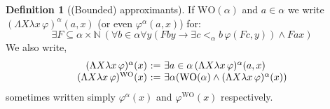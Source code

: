 \documentclass[10pt,a4paper]{amsart}
\theoremstyle{plain}
\theoremstyle{definition}
\newtheorem{definition}[definition]{Definition}
\renewcommand{\phi}{\varphi}
\theoremstyle{plain}
\theoremstyle{definition} %
\newcommand{\Nat}{\mathbb{N}}
\renewcommand{\land}{\wedge}
\newcommand{\limp}{\to}
\newcommand{\Sin}[2]{\Sigma^{#1}_{#2}}
\newcommand{\WO}{\mathrm{WO}}
\newcommand{\oper}[3]{\Lambda #1 \lambda #2 \, #3}
\newcommand{\apprx}[4]{(\oper #1 #2 #3)^{#4}}
\begin{document}
\begin{definition}
[(Bounded) approximants]
If $\WO(\alpha)$ and $a \in \alpha$ we write $\apprx X x {\phi} \alpha (a,x) $ (or even $\phi^\alpha (a,x)$) for:
\[
\exists F\subseteq \alpha \times \Nat \ (\forall b \in \alpha \forall y (Fby  \limp \exists c<_\alpha b\,  \phi (Fc,y)) \land  Fax)
\]
We also write,
\[
\begin{array}{r@{\ := \ }l}
     \apprx X x \phi \alpha(x) & \exists a \in \alpha \, \apprx X x\phi \alpha(a,x) \\
     \apprx X x \phi \WO (x) & 
     \exists \alpha ( \WO(\alpha) \land  \apprx X x \phi \alpha(x) ) 
\end{array}
\]
sometimes written simply $\phi^\alpha(x)$ and $\phi^\WO(x)$ respectively.
\end{definition}

\end{document}
